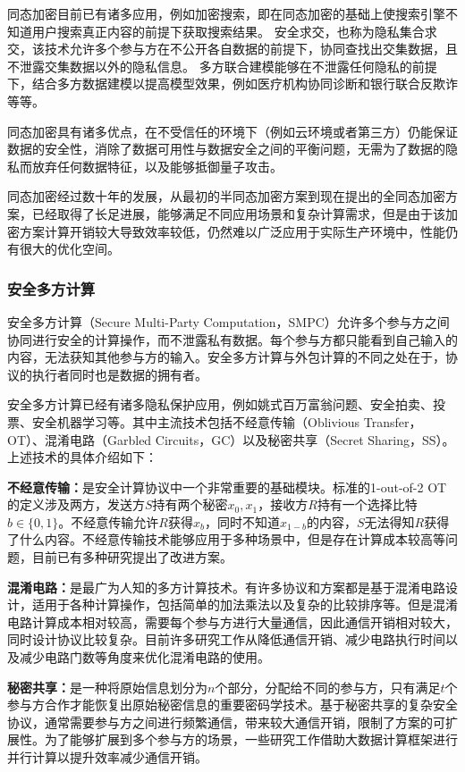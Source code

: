 同态加密目前已有诸多应用，例如加密搜索，即在同态加密的基础上使搜索引擎不知道用户搜索真正内容的前提下获取搜索结果。
安全求交，也称为隐私集合求交，该技术允许多个参与方在不公开各自数据的前提下，协同查找出交集数据，且不泄露交集数据以外的隐私信息。
多方联合建模能够在不泄露任何隐私的前提下，结合多方数据建模以提高模型效果，例如医疗机构协同诊断和银行联合反欺诈等等。

同态加密具有诸多优点，在不受信任的环境下（例如云环境或者第三方）仍能保证数据的安全性，消除了数据可用性与数据安全之间的平衡问题，无需为了数据的隐私而放弃任何数据特征，以及能够抵御量子攻击。

同态加密经过数十年的发展，从最初的半同态加密方案到现在提出的全同态加密方案，已经取得了长足进展，能够满足不同应用场景和复杂计算需求，但是由于该加密方案计算开销较大导致效率较低，仍然难以广泛应用于实际生产环境中，性能仍有很大的优化空间。

\subsubsection{安全多方计算}
安全多方计算（Secure Multi-Party Computation，SMPC）允许多个参与方之间协同进行安全的计算操作，而不泄露私有数据。每个参与方都只能看到自己输入的内容，无法获知其他参与方的输入。安全多方计算与外包计算的不同之处在于，协议的执行者同时也是数据的拥有者\cite{2018A}。

安全多方计算已经有诸多隐私保护应用，例如姚式百万富翁问题\cite{1982Protocols}、安全拍卖、投票、安全机器学习\cite{2017Oblivious}等。其中主流技术包括不经意传输（Oblivious Transfer，OT）、混淆电路（Garbled Circuits，GC）以及秘密共享（Secret Sharing，SS）。上述技术的具体介绍如下：
\begin{compactitem}
	\item \textbf{不经意传输：}是安全计算协议中一个非常重要的基础模块。标准的1-out-of-2 OT的定义涉及两方，发送方$ S $持有两个秘密$ x_0,x_1$，接收方$ R $持有一个选择比特$ b\in\{0,1\} $。不经意传输允许$ R $获得$ x_b $，同时不知道$ x_{1-b} $的内容，$ S $无法得知$ R $获得了什么内容。不经意传输技术能够应用于多种场景中，但是存在计算成本较高等问题，目前已有多种研究提出了改进方案。
	\item \textbf{混淆电路：}是最广为人知的多方计算技术。有许多协议和方案都是基于混淆电路设计，适用于各种计算操作，包括简单的加法乘法以及复杂的比较排序等。但是混淆电路计算成本相对较高，需要每个参与方进行大量通信，因此通信开销相对较大，同时设计协议比较复杂。目前许多研究工作从降低通信开销\cite{goyal2008efficient}、减少电路执行时间\cite{malkhi2004fairplay}以及减少电路门数\cite{pinkas2009secure}等角度来优化混淆电路的使用。
	\item \textbf{秘密共享：}是一种将原始信息划分为$n$个部分，分配给不同的参与方，只有满足$t$个参与方合作才能恢复出原始秘密信息的重要密码学技术。基于秘密共享的复杂安全协议，通常需要参与方之间进行频繁通信，带来较大通信开销，限制了方案的可扩展性。为了能够扩展到多个参与方的场景，一些研究工作借助大数据计算框架进行并行计算以提升效率减少通信开销。
\end{compactitem}

